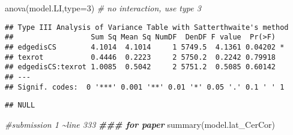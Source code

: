 \documentclass[
]{article}
\newenvironment{Shaded}{\begin{snugshade}}{\end{snugshade}}
\newcommand{\AttributeTok}[1]{\textcolor[rgb]{0.77,0.63,0.00}{#1}}
\newcommand{\CommentTok}[1]{\textcolor[rgb]{0.56,0.35,0.01}{\textit{#1}}}
\newcommand{\DecValTok}[1]{\textcolor[rgb]{0.00,0.00,0.81}{#1}}
\newcommand{\DocumentationTok}[1]{\textcolor[rgb]{0.56,0.35,0.01}{\textbf{\textit{#1}}}}
\newcommand{\FunctionTok}[1]{\textcolor[rgb]{0.00,0.00,0.00}{#1}}
\newcommand{\NormalTok}[1]{#1}
\newcommand{\SpecialCharTok}[1]{\textcolor[rgb]{0.00,0.00,0.00}{#1}}
\begin{document}
\begin{Shaded}
\begin{Highlighting}[]
\FunctionTok{anova}\NormalTok{(model.LI,}\AttributeTok{type=}\DecValTok{3}\NormalTok{) }\CommentTok{\# no interaction, use type 3}
\end{Highlighting}
\end{Shaded}

\begin{verbatim}
## Type III Analysis of Variance Table with Satterthwaite's method
##                  Sum Sq Mean Sq NumDF  DenDF F value  Pr(>F)  
## edgedisCS        4.1014  4.1014     1 5749.5  4.1361 0.04202 *
## texrot           0.4446  0.2223     2 5750.2  0.2242 0.79918  
## edgedisCS:texrot 1.0085  0.5042     2 5751.2  0.5085 0.60142  
## ---
## Signif. codes:  0 '***' 0.001 '**' 0.01 '*' 0.05 '.' 0.1 ' ' 1
\end{verbatim}

\begin{Shaded}
\end{Shaded}

\begin{verbatim}
## NULL
\end{verbatim}

\begin{Shaded}
\begin{Highlighting}[]
\CommentTok{\#submission 1 \textasciitilde{}line 333}
\DocumentationTok{\#\#\# for paper}
\FunctionTok{summary}\NormalTok{(model.lat\_CerCor)}
\end{Highlighting}
\end{Shaded}
\end{document}
